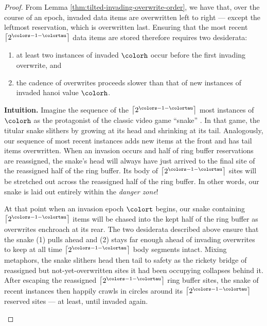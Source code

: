 \begin{proof}
From Lemma \ref{thm:tilted-invading-overwrite-order}, we have that, over the course of an epoch, invaded data items are overwritten left to right --- except the leftmost reservation, which is overwritten last.
Ensuring that the most recent $\left\lceil 2^{\colors - 1 - \colortau} \right\rceil$ data items are stored therefore requires two desiderata:
\begin{enumerate}
\item at least two instances of invaded \hv{} $\colorh$ occur before the first invading overwrite, and
\item the cadence of overwrites proceeds slower than that of new instances of invaded hanoi value $\colorh$.
\end{enumerate}


\begin{mybox}
\textbf{Intuition.}
Imagine the sequence of the $\left\lceil 2^{\colors - 1 - \colortau} \right\rceil$ most instances of \hv{} $\colorh$ as the protagonist of the classic video game ``snake'' \citep{de2016complexity}.
In that game, the titular snake slithers by growing at its head and shrinking at its tail.
Analogously, our sequence of most recent \hv{} instances adds new items at the front and has tail items overwritten.
When an invasion occurs and half of ring buffer reservations are reassigned, the snake's head will always have just arrived to the final site of the reassigned half of the ring buffer.
Its body of $\left\lceil 2^{\colors - 1 - \colortau} \right\rceil$ sites will be stretched out across the reassigned half of the ring buffer.
In other words, our snake is laid out entirely within the \textit{danger zone}!

At that point when an invasion epoch $\colort$ begins, our snake containing $\left\lceil 2^{\colors - 1 - \colortau} \right\rceil$ items will be chased into the kept half of the ring buffer as overwrites enchroach at its rear.
The two desiderata described above ensure that the snake (1) pulls ahead and (2) stays far enough ahead of invading overwrites to keep at all time $\left\lceil 2^{\colors - 1 - \colortau} \right\rceil$ body segments intact.
Mixing metaphors, the snake slithers head then tail to safety as the rickety bridge of reassigned but not-yet-overwritten sites it had been occupying collapses behind it.
After escaping the reassigned $\left\lceil 2^{\colors - 1 - \colortau} \right\rceil$ ring buffer sites, the snake of recent \hv{} instances then happily crawls in circles around its $\left\lceil 2^{\colors - 1 - \colortau} \right\rceil$ reserved sites --- at least, until invaded again.
\end{mybox}


\end{proof}
